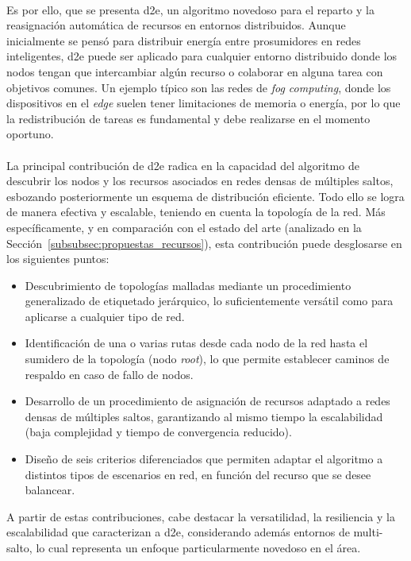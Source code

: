 \\
Es por ello, que se presenta \gls{d2e}, un algoritmo novedoso para el reparto y la reasignación automática de recursos en entornos distribuidos. Aunque inicialmente se pensó para distribuir energía entre prosumidores en redes inteligentes, \gls{d2e} puede ser aplicado para cualquier entorno distribuido donde los nodos tengan que intercambiar algún recurso o colaborar en alguna tarea con objetivos comunes.  Un ejemplo típico son las redes de \textit{fog computing}, donde los dispositivos en el \textit{edge} suelen tener limitaciones de memoria o energía, por lo que la redistribución de tareas es fundamental y debe realizarse en el momento oportuno.\\
\\
La principal contribución de \gls{d2e} radica en la capacidad del algoritmo de descubrir los nodos y los recursos asociados en redes densas de múltiples saltos, esbozando posteriormente un esquema de distribución eficiente. Todo ello se logra de manera efectiva y escalable, teniendo en cuenta la topología de la red. Más específicamente, y en comparación con el estado del arte (analizado en la Sección~\ref{subsubsec:propuestas_recursos}), esta contribución puede desglosarse en los siguientes puntos:

\begin{itemize}
    \item Descubrimiento de topologías malladas mediante un procedimiento generalizado de etiquetado jerárquico, lo suficientemente versátil como para aplicarse a cualquier tipo de red.
    
    \item Identificación de una o varias rutas desde cada nodo de la red hasta el sumidero de la topología (nodo \textit{root}), lo que permite establecer caminos de respaldo en caso de fallo de nodos.
    
    \item Desarrollo de un procedimiento de asignación de recursos adaptado a redes densas de múltiples saltos, garantizando al mismo tiempo la escalabilidad (baja complejidad y tiempo de convergencia reducido).
    
    \item Diseño de seis criterios diferenciados que permiten adaptar el algoritmo a distintos tipos de escenarios en red, en función del recurso que se desee balancear. 
\end{itemize}

A partir de estas contribuciones, cabe destacar la versatilidad, la resiliencia y la escalabilidad que caracterizan a \gls{d2e}, considerando además entornos de multi-salto, lo cual representa un enfoque particularmente novedoso en el área.

